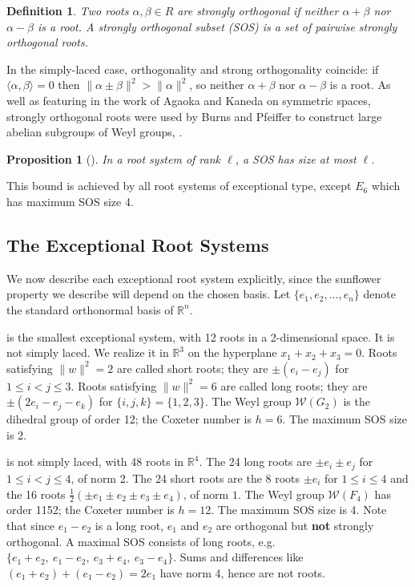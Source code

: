 \documentclass[11pt]{article}
\newtheorem{proposition}[theorem]{Proposition}
\newtheorem{definition}[theorem]{Definition}
\newcommand{\W}{\mathcal{W}}
\begin{document}
\begin{definition}
Two roots $\alpha, \beta \in R$ are \emph{strongly orthogonal} if neither $\alpha + \beta$ nor $\alpha - \beta$ is a root. A \emph{strongly orthogonal subset} (SOS) is a set of pairwise strongly orthogonal roots.
\end{definition}

In the simply-laced case, orthogonality and strong orthogonality coincide: if $\langle \alpha, \beta \rangle = 0$ then $\|\alpha \pm \beta\|^2 > \|\alpha\|^{2}$, so neither $\alpha + \beta$ nor $\alpha - \beta$ is a root. As well as featuring in the work of Agaoka and Kaneda on symmetric spaces, strongly orthogonal roots were used by Burns and Pfeiffer to construct large abelian subgroups of Weyl groups, \cite{BurnsPfeiffer}. 

\begin{proposition}[\cite{Agaoka}]
In a root system of rank $\ell$, a SOS has size at most $\ell$.
\end{proposition}

This bound is achieved by all root systems of exceptional type, except $E_6$ which has maximum SOS size 4. 

\subsection{The Exceptional Root Systems}

We now describe each exceptional root system explicitly, since the sunflower property we describe will depend on the chosen basis. Let $\{e_1, e_2, \ldots, e_n\}$ denote the standard orthonormal basis of $\mathbb{R}^n$.

 is the smallest exceptional system, with 12 roots in a 2-dimensional space. It is not simply laced. We realize it in $\mathbb{R}^3$ on the hyperplane $x_1 + x_2 + x_3 = 0$.
Roots satisfying $\|w\|^{2} = 2$ are called short roots; they are $\pm(e_i - e_j)$ for $1 \leq i < j \leq 3$. Roots satisfying $\|w\|^{2} = 6$ are called long roots; they are $\pm(2e_i - e_j - e_k)$ for $\{i,j,k\} = \{1,2,3\}$. The Weyl group $\W(G_2)$ is the dihedral group of order 12; the Coxeter number is $h = 6$. The maximum SOS size is 2.

 is not simply laced, with 48 roots in $\mathbb{R}^4$. The 24 long roots are $\pm e_i \pm e_j$ for $1 \leq i < j \leq 4$, of norm 2. The 24 short roots are the 8 roots $\pm e_i$ for $1 \leq i \leq 4$ and the 16 roots $\frac{1}{2}(\pm e_1 \pm e_2 \pm e_3 \pm e_4)$, of norm $1$. The Weyl group $\W(F_4)$ has order 1152; the Coxeter number is $h = 12$. The maximum SOS size is 4. Note that since $e_1 - e_2$ is a long root, $e_1$ and $e_2$ are orthogonal but \textbf{not} strongly orthogonal. A maximal SOS consists of long roots, e.g. $\{e_1 + e_2,\ e_1 - e_2,\ e_3 + e_4,\ e_3 - e_4\}$. Sums and differences like $(e_1 + e_2) + (e_1 - e_2) = 2e_1$ have norm 4, hence are not roots.
\end{document}
